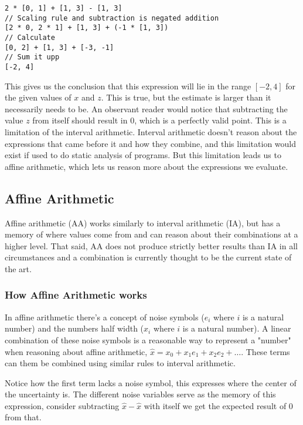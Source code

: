 \documentclass[msc,lith,english]{liuthesis}
\begin{document}
\begin{verbatim}
2 * [0, 1] + [1, 3] - [1, 3]
// Scaling rule and subtraction is negated addition 
[2 * 0, 2 * 1] + [1, 3] + (-1 * [1, 3])
// Calculate
[0, 2] + [1, 3] + [-3, -1]
// Sum it upp
[-2, 4]
\end{verbatim}

This gives us the conclusion that this expression will lie in the range $[-2, 4]$ for the given values of $x$ and $z$. This is true, but the estimate is larger than it necessarily needs to be. An observant reader would notice that subtracting the value $z$ from itself should result in $0$, which is a perfectly valid point. This is a limitation of the interval arithmetic. Interval arithmetic doesn't reason about the expressions that came before it and how they combine, and this limitation would exist if used to do static analysis of programs. But this limitation leads us to affine arithmetic, which lets us reason more about the expressions we evaluate.


\subsection{Affine Arithmetic}
Affine arithmetic (AA) works similarly to interval arithmetic (IA), but has a memory of where values come from and can reason about their combinations at a higher level. That said, AA does not produce strictly better results than IA in all circumstances and a combination is currently thought to be the current state of the art. 

\subsubsection{How Affine Arithmetic works}
In affine arithmetic there's a concept of noise symbols ($e_i$ where $i$ is a natural number) and the numbers half width ($x_i$ where $i$ is a natural number). A linear combination of these noise symbols is a reasonable way to represent a "number" when reasoning about affine arithmetic, $\hat{x} = x_0 + x_1e_1 + x_2e_2 + \dots$. These terms can them be combined using similar rules to interval arithmetic.

Notice how the first term lacks a noise symbol, this expresses where the center of the uncertainty is. The different noise variables serve as the memory of this expression, consider subtracting $\hat{x} - \hat{x}$ with itself we get the expected result of 0 from that.
\end{document}
